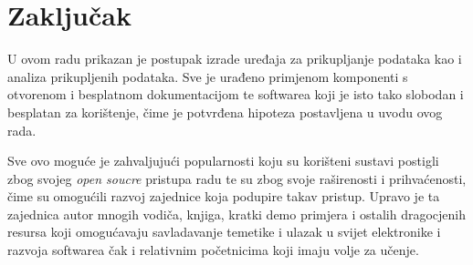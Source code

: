 \chapter{Zaključak}\label{ch:Zakljucak}
U ovom radu prikazan je postupak izrade uređaja za prikupljanje podataka kao i analiza prikupljenih podataka.
Sve je urađeno primjenom komponenti s otvorenom i besplatnom dokumentacijom te softwarea koji je isto tako slobodan i besplatan za korištenje, čime je potvrđena hipoteza postavljena u uvodu ovog rada.

Sve ovo moguće je zahvaljujući popularnosti koju su korišteni sustavi postigli zbog svojeg \textit{open soucre} pristupa radu te su zbog svoje raširenosti i prihvaćenosti, čime su omogućili razvoj zajednice koja podupire takav pristup.
Upravo je ta zajednica autor mnogih vodiča, knjiga, kratki demo primjera i ostalih dragocjenih resursa koji omogućavaju savladavanje temetike i ulazak u svijet elektronike i razvoja softwarea čak i relativnim početnicima koji imaju volje za učenje.